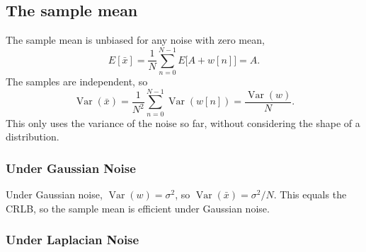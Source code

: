 \documentclass[11pt]{article}
\numberwithin{figure}{section}
\numberwithin{equation}{section}
\begin{document}
\subsection{The sample mean}

The sample mean is unbiased for any noise with zero mean,
\[
  E[\bar x] = \frac{1}{N}\sum_{n=0}^{N-1} E\bigl[A + w[n]\bigr] = A.
\]
The samples are independent, so
\begin{equation}
  \operatorname{Var}(\bar x) = \frac{1}{N^2}\sum_{n=0}^{N-1}\operatorname{Var}(w[n])
  = \frac{\operatorname{Var}(w)}{N}.
  \label{eq:varmean}
\end{equation}
This only uses the variance of the noise so far, without considering the shape of a distribution.
\subsubsection{Under Gaussian Noise}
Under Gaussian noise, $\operatorname{Var}(w) = \sigma^2$, so $\operatorname{Var}(\bar x) =
\sigma^2/N$. This equals the CRLB, so the sample mean is efficient under Gaussian noise.

\subsubsection{Under Laplacian Noise}
\end{document}
